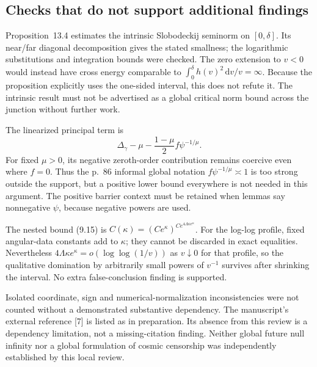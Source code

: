 \documentclass[10pt]{article}
\begin{document}
\subsection*{Checks that do not support additional findings}
Proposition 13.4 estimates the intrinsic Slobodeckij seminorm on \([0,\delta]\). Its near/far diagonal decomposition gives the stated smallness; the logarithmic substitutions and integration bounds were checked. The zero extension to \(v<0\) would instead have cross energy comparable to \(\int_0^\delta h(v)^2\,\mathrm dv/v=\infty\). Because the proposition explicitly uses the one-sided interval, this does not refute it. The intrinsic result must not be advertised as a global critical norm bound across the junction without further work.\par
The linearized principal term is \[\Delta_\gamma-\mu-\frac{1-\mu}{2}f\psi^{-1/\mu}.\] For fixed \(\mu>0\), its negative zeroth-order contribution remains coercive even where \(f=0\). Thus the p. 86 informal global notation \(f\psi^{-1/\mu}\asymp1\) is too strong outside the support, but a positive lower bound everywhere is not needed in this argument. The positive barrier context must be retained when lemmas say nonnegative \(\psi\), because negative powers are used.\par
The nested bound (9.15) is \(C(\kappa)=(Ce^\kappa)^{C e^{4\Lambda\kappa e^\kappa}}\). For the log-log profile, fixed angular-data constants add to \(\kappa\); they cannot be discarded in exact equalities. Nevertheless \(4\Lambda\kappa e^\kappa=o(\log\log(1/v))\) as \(v\downarrow0\) for that profile, so the qualitative domination by arbitrarily small powers of \(v^{-1}\) survives after shrinking the interval. No extra false-conclusion finding is supported.\par
Isolated coordinate, sign and numerical-normalization inconsistencies were not counted without a demonstrated substantive dependency. The manuscript’s external reference [7] is listed as in preparation. Its absence from this review is a dependency limitation, not a missing-citation finding. Neither global future null infinity nor a global formulation of cosmic censorship was independently established by this local review.\par
\end{document}

